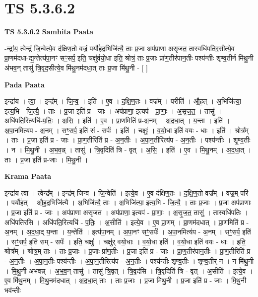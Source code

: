 \documentclass[17pt]{extarticle}
\begin{document}
\section{ TS 5.3.6.2 }

\textbf{TS 5.3.6.2 } \newline
\textbf{Samhita Paata} \newline

-न्द्रा॑य॒ त्वेन्द्रं॑ जि॒न्वेत्ये॒व द॑क्षिण॒तो वज्रं॒ पर्यौ॑हद॒भिजि॑त्यै॒ ताः प्र॒जा अप॑प्राणा असृजत॒ तास्वधि॑पतिर॒सीत्ये॒व प्रा॒णम॑दधा-द्य॒न्तेत्य॑पा॒नꣳ सꣳ॒॒सर्प॒ इति॒ चक्षु॑र्वयो॒धा इति॒ श्रोत्रं॒ ताः प्र॒जाः प्रा॑ण॒तीर॑पान॒तीः पश्य॑न्तीः शृण्व॒तीर्न मि॑थु॒नी अ॑भव॒न् तासु॑ त्रि॒वृद॒सीत्ये॒व मि॑थु॒नम॑दधा॒त् ताः प्र॒जा मि॑थु॒नी - [  ] \newline

\textbf{Pada Paata} \newline

इन्द्रा॑य । त्वा॒ । इन्द्र᳚म् । जि॒न्व॒ । इति॑ । ए॒व । द॒क्षि॒ण॒तः । वज्र᳚म् । परीति॑ । औ॒ह॒त् । अ॒भिजि॑त्या॒ इत्य॒भि - जि॒त्यै॒ । ताः । प्र॒जा इति॑ प्र - जाः । अप॑प्राणा॒ इत्यप॑ - प्रा॒णाः॒ । अ॒सृ॒ज॒त॒ । तासु॑ । अधि॑पति॒रित्यधि॑-प॒तिः॒ । अ॒सि॒ । इति॑ । ए॒व । प्रा॒णमिति॑ प्र-अ॒नम् । अ॒द॒धा॒त् । य॒न्ता । इति॑ । अ॒पा॒नमित्य॑प - अ॒नम् । सꣳ॒॒सर्प॒ इति॑ सं - सर्पः॑ । इति॑ । चक्षुः॑ । व॒यो॒धा इति॑ वयः - धाः । इति॑ । श्रोत्र᳚म् । ताः । प्र॒जा इति॑ प्र - जाः । प्रा॒ण॒तीरिति॑ प्र - अ॒न॒तीः । अ॒पा॒न॒तीरित्य॑प - अ॒न॒तीः । पश्य॑न्तीः । शृ॒ण्व॒तीः । न । मि॒थु॒नी । अ॒भ॒व॒न्न् । तासु॑ । त्रि॒वृदिति॑ त्रि - वृत् । अ॒सि॒ । इति॑ । ए॒व । मि॒थु॒नम् । अ॒द॒धा॒त् । ताः । प्र॒जा इति॑ प्र-जाः । मि॒थु॒नी ।  \newline


\textbf{Krama Paata} \newline

इन्द्रा॑य त्वा । त्वेन्द्र᳚म् । इन्द्र॑म् जिन्व । जि॒न्वेति॑ । इत्ये॒व । ए॒व द॑क्षिण॒तः । द॒क्षि॒ण॒तो वज्र᳚म् । वज्र॒म् परि॑ । पर्यौ॑हत् । औ॒ह॒द॒भिजि॑त्यै । अ॒भिजि॑त्यै॒ ताः । अ॒भिजि॑त्या॒ इत्य॒भि - जि॒त्यै॒ । ताः प्र॒जाः । प्र॒जा अप॑प्राणाः । प्र॒जा इति॑ प्र - जाः । अप॑प्राणा असृजत । अप॑प्राणा॒ इत्यप॑ - प्रा॒णाः॒ । अ॒सृ॒ज॒त॒ तासु॑ । तास्वधि॑पतिः । अधि॑पतिरसि । अधि॑पति॒रित्यधि॑ - प॒तिः॒ । अ॒सीति॑ । इत्ये॒व । ए॒व प्रा॒णम् । प्रा॒णम॑दधात् । प्रा॒णमिति॑ प्र - अ॒नम् । अ॒द॒धा॒द् य॒न्ता । य॒न्तेति॑ । इत्य॑पा॒नम् । अ॒पा॒नꣳ सꣳ॒॒सर्पः॑ । अ॒पा॒नमित्य॑प - अ॒नम् । सꣳ॒॒सर्प॒ इति॑ । सꣳ॒॒सर्प॒ इति॑ सम् - सर्पः॑ । इति॒ चक्षुः॑ । चक्षु॑र् वयो॒धाः । व॒यो॒धा इति॑ । व॒यो॒धा इति॑ वयः - धाः । इति॒ श्रोत्र᳚म् । श्रोत्र॒म् ताः । ताः प्र॒जाः । प्र॒जाः प्रा॑ण॒तीः । प्र॒जा इति॑ प्र - जाः । प्रा॒ण॒तीर॑पान॒तीः । प्रा॒ण॒तीरिति॑ प्र - अ॒न॒तीः । अ॒पा॒न॒तीः पश्य॑न्तीः । अ॒पा॒न॒तीरित्य॑प - अ॒न॒तीः । पश्य॑न्तीः शृण्व॒तीः । शृ॒ण्व॒तीर् न । न मि॑थु॒नी । मि॒थु॒नी अ॑भवन्न् । अ॒भ॒व॒न् तासु॑ । तासु॑ त्रि॒वृत् । त्रि॒वृद॑सि । त्रि॒वृदिति॑ त्रि - वृत् । अ॒सीति॑ । इत्ये॒व । ए॒व मि॑थु॒नम् । मि॒थु॒नम॑दधात् । अ॒द॒धा॒त् ताः । ताः प्र॒जाः । प्र॒जा मि॑थु॒नी । प्र॒जा इति॑ प्र - जाः । मि॒थु॒नी भव॑न्तीः \newline
\end{document}
